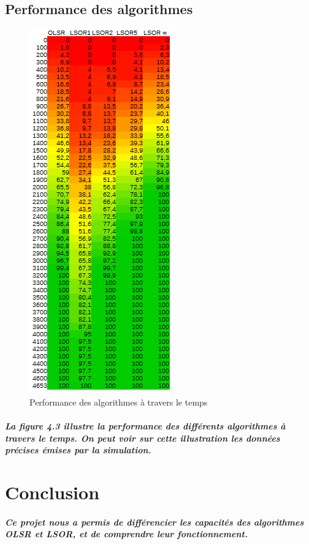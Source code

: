 \documentclass{report}
\begin{document}
\section{Performance des algorithmes}

\begin{figure}[h]
\caption{Performance des algorithmes à travers le temps}
\centering
\includegraphics[scale=0.8]{quentin_result/tableau.png}
\end{figure}

\paragraph{La figure 4.3 illustre la performance des différents algorithmes à travers le temps. On peut voir sur cette illustration les données précises émises par la simulation.}

\chapter{Conclusion}

\paragraph{Ce projet nous a permis de différencier les capacités des algorithmes OLSR et LSOR, et de comprendre leur fonctionnement. }
\end{document}

